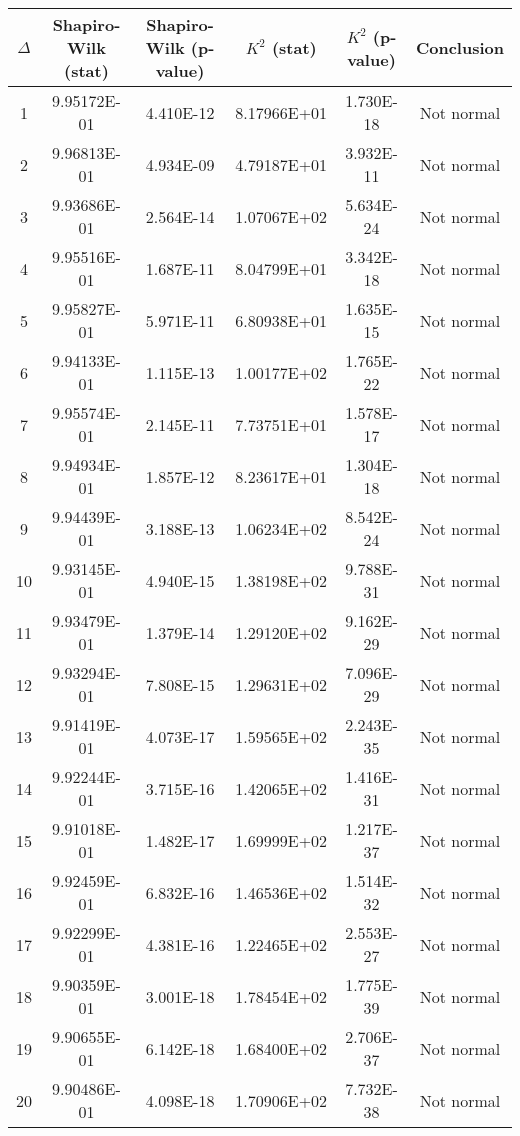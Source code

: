 \begin{table}[h]
	\begin{tabular}{|c|c|c|c|c|c|}
		\hline
		$\Delta$ &  Shapiro-Wilk (stat) & Shapiro-Wilk (p-value) & $K^2$ (stat) & $K^2$ (p-value) & Conclusion\\\hline
		\hline
		1 & 9.95172E-01 & 4.410E-12 & 8.17966E+01 & 1.730E-18 & Not normal\\\hline
		2 & 9.96813E-01 & 4.934E-09 & 4.79187E+01 & 3.932E-11 & Not normal\\\hline
		3 & 9.93686E-01 & 2.564E-14 & 1.07067E+02 & 5.634E-24 & Not normal\\\hline
		4 & 9.95516E-01 & 1.687E-11 & 8.04799E+01 & 3.342E-18 & Not normal\\\hline
		5 & 9.95827E-01 & 5.971E-11 & 6.80938E+01 & 1.635E-15 & Not normal\\\hline
		6 & 9.94133E-01 & 1.115E-13 & 1.00177E+02 & 1.765E-22 & Not normal\\\hline
		7 & 9.95574E-01 & 2.145E-11 & 7.73751E+01 & 1.578E-17 & Not normal\\\hline
		8 & 9.94934E-01 & 1.857E-12 & 8.23617E+01 & 1.304E-18 & Not normal\\\hline
		9 & 9.94439E-01 & 3.188E-13 & 1.06234E+02 & 8.542E-24 & Not normal\\\hline
		10 & 9.93145E-01 & 4.940E-15 & 1.38198E+02 & 9.788E-31 & Not normal\\\hline
		11 & 9.93479E-01 & 1.379E-14 & 1.29120E+02 & 9.162E-29 & Not normal\\\hline
		12 & 9.93294E-01 & 7.808E-15 & 1.29631E+02 & 7.096E-29 & Not normal\\\hline
		13 & 9.91419E-01 & 4.073E-17 & 1.59565E+02 & 2.243E-35 & Not normal\\\hline
		14 & 9.92244E-01 & 3.715E-16 & 1.42065E+02 & 1.416E-31 & Not normal\\\hline
		15 & 9.91018E-01 & 1.482E-17 & 1.69999E+02 & 1.217E-37 & Not normal\\\hline
		16 & 9.92459E-01 & 6.832E-16 & 1.46536E+02 & 1.514E-32 & Not normal\\\hline
		17 & 9.92299E-01 & 4.381E-16 & 1.22465E+02 & 2.553E-27 & Not normal\\\hline
		18 & 9.90359E-01 & 3.001E-18 & 1.78454E+02 & 1.775E-39 & Not normal\\\hline
		19 & 9.90655E-01 & 6.142E-18 & 1.68400E+02 & 2.706E-37 & Not normal\\\hline
		20 & 9.90486E-01 & 4.098E-18 & 1.70906E+02 & 7.732E-38 & Not normal\\\hline

\end{tabular}
\end{table}
